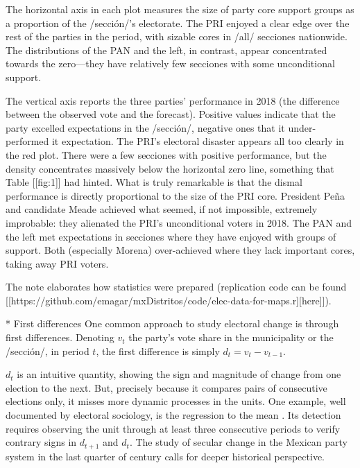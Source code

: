 \documentclass[letter,12pt]{article}
\begin{document}

The horizontal axis in each plot measures the size of party core support groups as a proportion of the /sección/'s electorate. The PRI enjoyed a clear edge over the rest of the parties in the period, with sizable cores in /all/ secciones nationwide. The distributions of the PAN and the left, in contrast, appear concentrated towards the zero---they have relatively few secciones with some unconditional support. 

The vertical axis reports the three parties' performance in 2018 (the difference between the observed vote and the forecast). Positive values indicate that the party excelled expectations in the /sección/, negative ones that it under-performed it expectation. The PRI's electoral disaster appears all too clearly in the red plot. There were a few secciones with positive performance, but the density concentrates massively below the horizontal zero line, something that Table [[fig:1]] had hinted. What is truly remarkable is that the dismal performance is directly proportional to the size of the PRI core. President Peña and candidate Meade achieved what seemed, if not impossible, extremely improbable: they alienated the PRI's unconditional voters in 2018. The PAN and the left met expectations in secciones where they have enjoyed with groups of support. Both (especially Morena) over-achieved where they lack important cores, taking away PRI voters. 

The note elaborates how statistics were prepared (replication code can be found [[https://github.com/emagar/mxDistritos/code/elec-data-for-maps.r][here]]).



* First differences
One common approach to study electoral change is through first differences. Denoting $v_t$ the party's vote share in the municipality or the /sección/, in period $t$, the first difference is simply $d_t = v_t - v_{t-1}$. 

$d_t$ is an intuitive quantity, showing the sign and magnitude of change from one election to the next. But, precisely because it compares pairs of consecutive elections only, it misses more dynamic processes in the units. One example, well documented by electoral sociology, is the regression to the mean \citep{campbell.1991,segovia.1979}. Its detection requires observing the unit through at least three consecutive periods to verify contrary signs in $d_{t+1}$ and $d_t$. The study of secular change in the Mexican party system in the last quarter of century calls for deeper historical perspective. 
\end{document}
